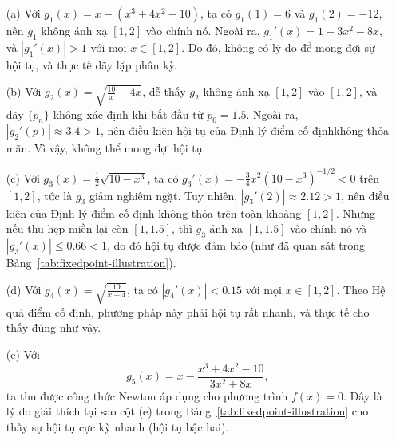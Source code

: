 \begin{itemize}
  \item[(a)] Với $g_1(x) = x - (x^3 + 4x^2 - 10)$, ta có $g_1(1) = 6$ và $g_1(2) = -12$, nên $g_1$ không ánh xạ $[1,2]$ vào chính nó. 
  Ngoài ra, $g_1'(x) = 1 - 3x^2 - 8x$, và $|g_1'(x)| > 1$ với mọi $x \in [1,2]$. 
  Do đó, không có lý do để mong đợi sự hội tụ, và thực tế dãy lặp phân kỳ.

  \item[(b)] Với $g_2(x) = \sqrt{\tfrac{10}{x} - 4x}$, dễ thấy $g_2$ không ánh xạ $[1,2]$ vào $[1,2]$, và dãy $\{p_n\}$ không xác định khi bắt đầu từ $p_0 = 1.5$. 
  Ngoài ra, $|g_2'(p)| \approx 3.4 > 1$, nên điều kiện hội tụ của Định lý điểm cố địnhkhông thỏa mãn. 
  Vì vậy, không thể mong đợi hội tụ.

  \item[(c)] Với $g_3(x) = \tfrac{1}{2}\sqrt{10 - x^3}$, ta có $g_3'(x) = -\tfrac{3}{4}x^2(10 - x^3)^{-1/2} < 0$ trên $[1,2]$, 
  tức là $g_3$ giảm nghiêm ngặt. Tuy nhiên, $|g_3'(2)| \approx 2.12 > 1$, nên điều kiện của Định lý điểm cố định không thỏa trên toàn khoảng $[1,2]$. 
  Nhưng nếu thu hẹp miền lại còn $[1,1.5]$, thì $g_3$ ánh xạ $[1,1.5]$ vào chính nó và $|g_3'(x)| \leq 0.66 < 1$, 
  do đó hội tụ được đảm bảo (như đã quan sát trong Bảng~\ref{tab:fixedpoint-illustration}).

  \item[(d)] Với $g_4(x) = \sqrt{\tfrac{10}{x+4}}$, ta có $|g_4'(x)| < 0.15$ với mọi $x \in [1,2]$. 
  Theo Hệ quả điểm cố định, phương pháp này phải hội tụ rất nhanh, và thực tế cho thấy đúng như vậy.

  \item[(e)] Với 
  \[
  g_5(x) = x - \frac{x^3 + 4x^2 - 10}{3x^2 + 8x},
  \]
  ta thu được công thức Newton áp dụng cho phương trình $f(x) = 0$. 
  Đây là lý do giải thích tại sao cột (e) trong Bảng~\ref{tab:fixedpoint-illustration} cho thấy sự hội tụ cực kỳ nhanh (hội tụ bậc hai).
\end{itemize}
